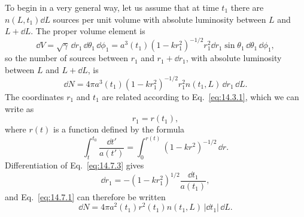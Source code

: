 To begin in a very general way, let us assume that at time \(t_1\) there are
\(n(L,t_1)\dd L\) sources per unit volume with absolute luminosity between
\(L\) and \(L+\dd L\). The proper volume element is
\[
  \dd V
  =
  \sqrt{\gamma}\,\dd r_1\,\dd\theta_1\,\dd\phi_1
  =
  a^3(t_1)(1-kr_1^2)^{-1/2}r_1^2
  \dd r_1\sin\theta_1\,\dd\theta_1\,\dd\phi_1,
\]
so the number of sources between \(r_1\) and \(r_1+\dd r_1\), with absolute
luminosity between \(L\) and \(L+\dd L\), is
\begin{equation}
  \dd N
  =
  4\pi a^3(t_1)(1-kr_1^2)^{-1/2}r_1^2
  n(t_1,L)\,\dd r_1\,\dd L.
  \tag{14.7.1}\label{eq:14.7.1}
\end{equation}
The coordinates \(r_1\) and \(t_1\) are related according to
Eq.~\eqref{eq:14.3.1}, which we can write as
\begin{equation}
  r_1=r(t_1),
  \tag{14.7.2}\label{eq:14.7.2}
\end{equation}
where \(r(t)\) is a function defined by the formula
\begin{equation}
  \int_t^{t_0}\frac{\dd t'}{a(t')}
  =
  \int_0^{r(t)}(1-kr^2)^{-1/2}\,\dd r.
  \tag{14.7.3}\label{eq:14.7.3}
\end{equation}
Differentiation of Eq.~\eqref{eq:14.7.3} gives
\[
  \dd r_1
  =
  -(1-kr_1^2)^{1/2}\frac{\dd t_1}{a(t_1)},
\]
and Eq.~\eqref{eq:14.7.1} can therefore be written
\begin{equation}
  \dd N
  =
  4\pi a^2(t_1)r^2(t_1)n(t_1,L)\,
  \lvert\dd t_1\rvert\,\dd L.
  \tag{14.7.4}\label{eq:14.7.4}
\end{equation}

